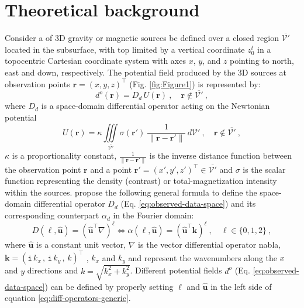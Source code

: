\section{Theoretical background}

Consider a of 3D gravity or magnetic sources be defined over a closed region 
$\overline{\mathcal{V}'}$ located in the subsurface, with top limited by a vertical 
coordinate $z^{t}_{0}$ in a topocentric Cartesian coordinate system with axes 
$x$, $y$, and $z$ pointing to north, east and down, respectively.
The potential field produced by the 3D sources at observation points 
$\mathbf{r} = (x, y, z)^{\top}$ (Fig.  \ref{fig:Figure1}) is represented by:
\begin{equation}
	d^{o}(\mathbf{r}) = D_{d} \, U(\mathbf{r}) \: , 
	\quad \mathbf{r} \notin \overline{\mathcal{V}'} \: ,
	\label{eq:observed-data-space}
\end{equation}
where $D_{d}$ is a space-domain differential operator acting on the Newtonian potential
\begin{equation}
	U(\mathbf{r}) = \kappa \iiint\limits_{\overline{\mathcal{V}'}}
	\sigma(\mathbf{r}') \: \frac{1}{\| \mathbf{r} - \mathbf{r}'\|}
	\: d\mathcal{V}' \: , 
	\quad \mathbf{r} \notin \overline{\mathcal{V}'} \: ,
	\label{eq:potential-U-space}
\end{equation}
$\kappa$ is a proportionality constant,
$\tfrac{1}{\| \mathbf{r} - \mathbf{r}' \|}$ is the inverse distance function
between the observation point $\mathbf{r}$ and a point 
$\mathbf{r}' = (x', y', z')^{\top} \in \overline{\mathcal{V}'}$
and $\sigma$ is the scalar function representing 
the density (contrast) or total-magnetization intensity within the sources.
\cite{oliveirajr_etal2026_1} propose the following general formula to define the 
space-domain differential operator $D_{d}$ (Eq. \ref{eq:observed-data-space}) 
and its corresponding counterpart $\alpha_{d}$ in the Fourier domain:
\begin{equation}
	D(\ell, \hat{\mathbf{u}}) = 
	\left( \hat{\mathbf{u}}^{\top} \nabla \right)^{\ell} \Leftrightarrow
	\alpha(\ell, \hat{\mathbf{u}}) = \left( \hat{\mathbf{u}}^{\top} \mathbf{k} \right)^{\ell} \: ,
	\quad \ell \in \{ 0, 1, 2 \} \: ,
	\label{eq:diff-operators-generic}
\end{equation}
where $\hat{\mathbf{u}}$ is a constant unit vector,
$\nabla$ is the vector differential operator nabla, 
$\mathbf{k} = ( \mathtt{i} \, k_{x} \, , \, \mathtt{i} \, k_{y} \, , \, k)^{\top}$
\citep{pedersen1978}, $k_{x}$ and $k_{y}$ and represent the wavenumbers along the $x$ and $y$
directions and $k = \sqrt{k_{x}^{2} + k_{y}^{2}}$.
Different potential fields $d^{o}$ (Eq. \ref{eq:observed-data-space}) can be 
defined by properly setting $\ell$ and $\hat{\mathbf{u}}$ in the left side of equation
\ref{eq:diff-operators-generic}. 

